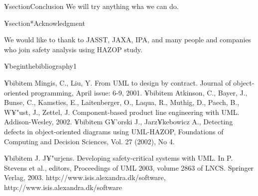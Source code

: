 ¥section{Conclusion}
We will try anything wha we can do.






¥section*{Acknowledgment}


We would like to thank to JASST, JAXA, IPA, and many people and companies who join safety analysis using HAZOP study.







%
¥begin{thebibliography}{1}




¥bibitem Mingis, C., Liu, Y. From UML to design by contract. Journal of object-oriented programming, April issue: 6-9, 2001.
¥bibitem  Atkinson, C., Bayer, J., Bunse, C., Kamsties, E., Laitenberger, O., Laqua, R., Muthig, D., Paech, B., W¥"{u}st, J., Zettel, J. Component-based product line engineering with UML. Addison-Wesley, 2002.
¥bibitem  G¥'{o}rski J., Jarz¥k{e}bowicz A., Detecting defects in object-oriented diagrams using UML-HAZOP, Foundations of Computing and Decision Sciences, Vol. 27 (2002), No 4.


¥bibitem  J. J¥"{u}rjens. Developing safety-critical systems with UML. In P. Stevens et al., editors, Proceedings of UML 2003, volume 2863 of LNCS. Springer Verlag, 2003. http://www.isis.alexandra.dk/software,  http://www.isis.alexandra.dk/software

